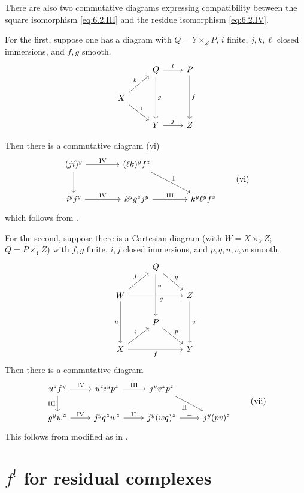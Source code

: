 There are also two commutative diagrams expressing compatibility between the square isomorphism \eqref{eq:6.2.III} and the residue isomorphism \eqref{eq:6.2.IV}.

For the first, suppose one has a diagram with $Q = Y\times_{Z} P$, $i$ finite, $j,k,\ell$ closed immersions, and $f,g$ smooth.
\[
\begin{tikzcd}
& Q\arrow[dd, "g"]\arrow[r, "l"]&P\arrow[dd, "f"]\\
X\arrow[ru, "k"]\arrow[rd, "i"]\\
&Y\arrow[r, "j"]&Z
\end{tikzcd}
\]


Then there is a commutative diagram (vi)
\[
\begin{tikzcd}[row sep=2.5em, column sep=4em]
	(ji)^y
	\arrow[r, "\text{IV}"]
	\arrow[d]
	& (\ell k)^y f^z
	\arrow[dr, "\text{I}"] \\
	i^y j^y
	\arrow[r, "\text{IV}"]
	& k^y g^z j^y
	\arrow[r, "\text{III}"]
	& k^y \ell^y f^z
\end{tikzcd}
\tag{vi}\label{eq:6.2.vi}
\]
which follows from .

For the second, suppose there is a Cartesian diagram (with $W = X\times_{Y} Z$; $Q = P\times_{Y} Z$) with $f,g$ finite, $i,j$ closed immersions, and $p,q,u,v,w$ smooth.
\[
\begin{tikzcd}
	& Q \arrow[dd, "v", pos=0.3] \arrow[rd, "q"] & \\
	W \arrow[ur, "j"] \arrow[rr, "g"', pos=0.6] \arrow[dd, "u"'] & & Z \arrow[dd, "w"] \\
	& P\arrow[rd, "p"] & \\
	X \arrow[ur, "i"] \arrow[rr, "f"'] & & Y
\end{tikzcd}
\]
Then there is a commutative diagram
\[
\begin{tikzcd}
u^{z}f^{y} \ar[r,"\mathrm{IV}"] \ar[d,"\mathrm{III}"'] & u^{z}i^{y}p^{z} \ar[r,"\mathrm{III}"] & j^{y}v^{z}p^{z}  \ar[dr,"\mathrm{II}"']\\
g^{y}w^{z} \ar[r,"\mathrm{IV}"] & j^{y}q^{z}w^{z} \ar[r,"\mathrm{II}"] & j^{y}(wq)^{z} \ar[r,"="]& j^{y}(pv)^{z}
\end{tikzcd}
\tag{vii}\label{eq:6.2.vii}
\]
This follows from  modified as in .

\par\endgroup

\section{$f^{!}$ for residual complexes}\label{sec:6.3}
\begingroup
\setlength{\emergencystretch}{2em}

